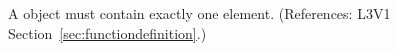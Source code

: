 A \FunctionDefinition object must contain exactly one 
element.  (References: L3V1 Section~\ref{sec:functiondefinition}.)
